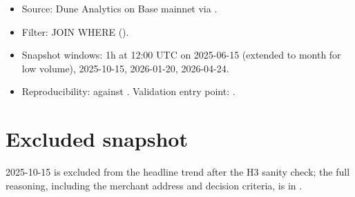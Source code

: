 \documentclass[11pt]{article}
\begin{document}
\begin{itemize}
  \item Source: Dune Analytics on Base mainnet via .
  \item Filter:  JOIN 
    WHERE 
    ().
  \item Snapshot windows: 1h at 12:00 UTC on 2025-06-15 (extended to month
    for low volume), 2025-10-15, 2026-01-20, 2026-04-24.
  \item Reproducibility:  against
    . Validation entry point:
    .
\end{itemize}

\section{Excluded snapshot}

2025-10-15 is excluded from the headline trend after the H3 sanity check; the
full reasoning, including the merchant address and decision criteria, is in
.
\end{document}
